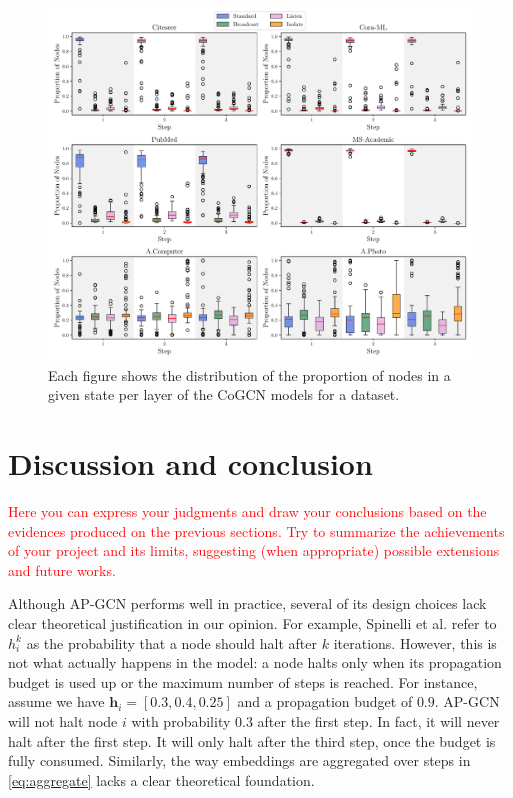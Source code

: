 \documentclass{gdl}
\begin{document}
\begin{figure}[p]
    \centering 
        \includegraphics[width=\textwidth]{Cooperative-AP-GCN_state_distribution_per_step.pdf}
        \caption{Each figure shows the distribution of the proportion of nodes in a given state per layer of the CoGCN models for a dataset.}
        \label{fig:cooperative-result} 
\end{figure}


\section{Discussion and conclusion}

\textcolor{red}{Here you can express your judgments and draw your conclusions based on the  evidences produced on the previous sections.
Try to summarize the achievements of your project and its limits, suggesting (when appropriate) possible extensions and future works.}

Although AP-GCN performs well in practice, several of its design choices lack clear theoretical justification in our opinion. For example, Spinelli et al. refer to $h_i^k$ as the probability that a node should halt after $k$ iterations. However, this is not what actually happens in the model: a node halts only when its propagation budget is used up or the maximum number of steps is reached. For instance, assume we have $\mathbf{h}_i = [0.3, 0.4, 0.25]$ and a propagation budget of $0.9$. AP-GCN will not halt node $i$ with probability $0.3$ after the first step. In fact, it will never halt after the first step. It will only halt after the third step, once the budget is fully consumed. Similarly, the way embeddings are aggregated over steps in \autoref{eq:aggregate} lacks a clear theoretical foundation.
\end{document}

